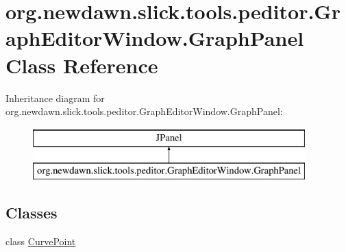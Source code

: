 \hypertarget{classorg_1_1newdawn_1_1slick_1_1tools_1_1peditor_1_1_graph_editor_window_1_1_graph_panel}{}\section{org.\+newdawn.\+slick.\+tools.\+peditor.\+Graph\+Editor\+Window.\+Graph\+Panel Class Reference}
\label{classorg_1_1newdawn_1_1slick_1_1tools_1_1peditor_1_1_graph_editor_window_1_1_graph_panel}
Inheritance diagram for org.\+newdawn.\+slick.\+tools.\+peditor.\+Graph\+Editor\+Window.\+Graph\+Panel\+:\begin{figure}[H]
\begin{center}
\leavevmode
\includegraphics[height=2.000000cm]{classorg_1_1newdawn_1_1slick_1_1tools_1_1peditor_1_1_graph_editor_window_1_1_graph_panel}
\end{center}
\end{figure}
\subsection*{Classes}
\begin{DoxyCompactItemize}
\item 
class \mbox{\hyperlink{classorg_1_1newdawn_1_1slick_1_1tools_1_1peditor_1_1_graph_editor_window_1_1_graph_panel_1_1_curve_point}{Curve\+Point}}
\end{DoxyCompactItemize}
